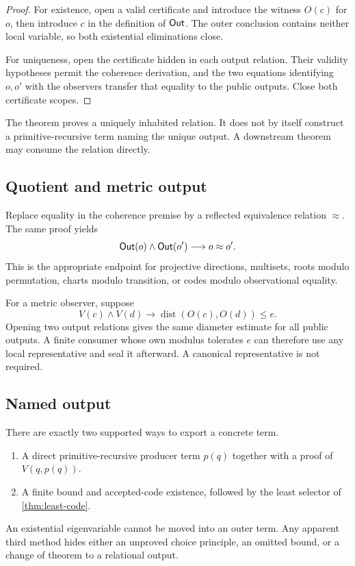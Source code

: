 \begin{proof}
For existence, open a valid certificate and introduce the witness \(O(c)\) for
\(o\), then introduce \(c\) in the definition of \(\mathsf{Out}\).  The outer
conclusion contains neither local variable, so both existential eliminations
close.

For uniqueness, open the certificate hidden in each output relation.  Their
validity hypotheses permit the coherence derivation, and the two equations
identifying \(o,o'\) with the observers transfer that equality to the public
outputs.  Close both certificate scopes.
\end{proof}

The theorem proves a uniquely inhabited relation.  It does not by itself
construct a primitive-recursive term naming the unique output.  A downstream
theorem may consume the relation directly.

\subsection{Quotient and metric output}

Replace equality in the coherence premise by a reflected equivalence relation
\(\approx\).  The same proof yields
\[
  \mathsf{Out}(o)\wedge\mathsf{Out}(o')\longrightarrow o\approx o'.
\]
This is the appropriate endpoint for projective directions, multisets, roots
modulo permutation, charts modulo transition, or codes modulo observational
equality.

For a metric observer, suppose
\[
  V(c)\wedge V(d)\longrightarrow
  \operatorname{dist}(O(c),O(d))\le e.
\]
Opening two output relations gives the same diameter estimate for all public
outputs.  A finite consumer whose own modulus tolerates \(e\) can therefore use
any local representative and seal it afterward.  A canonical representative
is not required.

\subsection{Named output}

There are exactly two supported ways to export a concrete term.

\begin{enumerate}[label=(\arabic*)]
\item A direct primitive-recursive producer term \(p(q)\) together with a proof
  of \(V(q,p(q))\).
\item A finite bound and accepted-code existence, followed by the least selector
  of \cref{thm:least-code}.
\end{enumerate}

An existential eigenvariable cannot be moved into an outer term.  Any apparent
third method hides either an unproved choice principle, an omitted bound, or a
change of theorem to a relational output.
